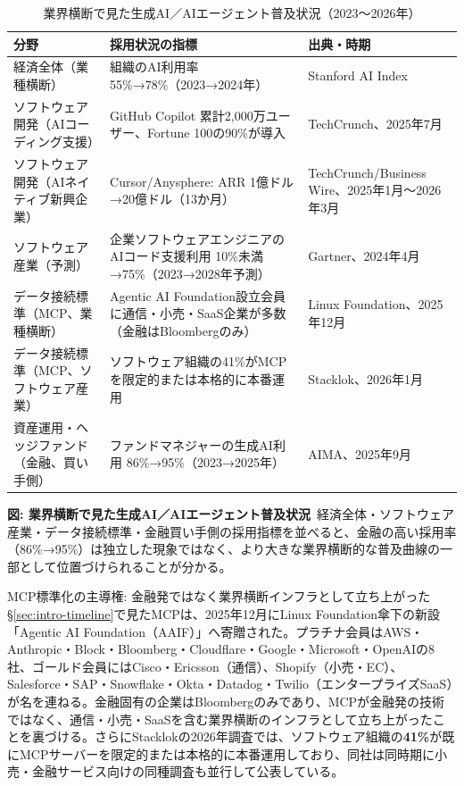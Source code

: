 \begin{table}[htbp]
\centering
\small
\caption{業界横断で見た生成AI／AIエージェント普及状況（2023〜2026年）}
\label{tab:intro-cross-domain-adoption}
\begin{tabular}{@{}p{30mm}p{62mm}p{34mm}@{}}
\toprule
\textbf{分野} & \textbf{採用状況の指標} & \textbf{出典・時期} \\
\midrule
経済全体（業種横断） & 組織のAI利用率 55\%→78\%（2023→2024年） & Stanford AI Index \cite{y01stanfordhai2025aiindex} \\
ソフトウェア開発（AIコーディング支援） & GitHub Copilot 累計2,000万ユーザー、Fortune 100の90\%が導入 & TechCrunch、2025年7月 \cite{y01techcrunch2025copilot20m} \\
ソフトウェア開発（AIネイティブ新興企業） & Cursor/Anysphere: ARR 1億ドル→20億ドル（13か月） & TechCrunch/Business Wire、2025年1月〜2026年3月 \cite{y01techcrunch2025cursorarr,y01businesswire2025cursorseriesd} \\
ソフトウェア産業（予測） & 企業ソフトウェアエンジニアのAIコード支援利用 10\%未満→75\%（2023→2028年予測） & Gartner、2024年4月 \cite{y01gartner2024aicodeassist} \\
データ接続標準（MCP、業種横断） & Agentic AI Foundation設立会員に通信・小売・SaaS企業が多数（金融はBloombergのみ） & Linux Foundation、2025年12月 \cite{y01linuxfoundation2025aaif} \\
データ接続標準（MCP、ソフトウェア産業） & ソフトウェア組織の41\%がMCPを限定的または本格的に本番運用 & Stacklok、2026年1月 \cite{y01stacklok2026mcpsoftware} \\
資産運用・ヘッジファンド（金融、買い手側） & ファンドマネジャーの生成AI利用 86\%→95\%（2023→2025年） & AIMA、2025年9月 \cite{x01aima2025} \\
\bottomrule
\end{tabular}
\end{table}
{\small\color{brandgray}\textbf{図: 業界横断で見た生成AI／AIエージェント普及状況}\ 経済全体・ソフトウェア産業・データ接続標準・金融買い手側の採用指標を並べると、金融の高い採用率（86\%→95\%）は独立した現象ではなく、より大きな業界横断的な普及曲線の一部として位置づけられることが分かる。}

\begin{casestudy}{MCP標準化の主導権: 金融発ではなく業界横断インフラとして立ち上がった}
\S\ref{sec:intro-timeline}で見たMCPは、2025年12月にLinux Foundation傘下の新設「Agentic AI Foundation（AAIF）」へ寄贈された。プラチナ会員はAWS・Anthropic・Block・Bloomberg・Cloudflare・Google・Microsoft・OpenAIの8社、ゴールド会員にはCisco・Ericsson（通信）、Shopify（小売・EC）、Salesforce・SAP・Snowflake・Okta・Datadog・Twilio（エンタープライズSaaS）が名を連ねる\cite{y01linuxfoundation2025aaif}。金融固有の企業はBloombergのみであり、MCPが金融発の技術ではなく、通信・小売・SaaSを含む業界横断のインフラとして立ち上がったことを裏づける。さらにStacklokの2026年調査では、ソフトウェア組織の\textbf{41\%}が既にMCPサーバーを限定的または本格的に本番運用しており、同社は同時期に小売・金融サービス向けの同種調査も並行して公表している\cite{y01stacklok2026mcpsoftware}。
\end{casestudy}

